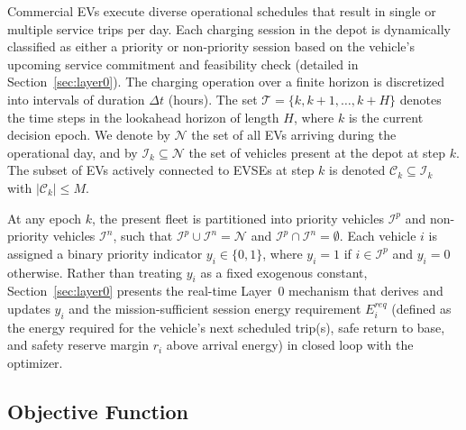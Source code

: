 \documentclass[final,3p,times,twocolumn]{elsarticle}
\begin{document}
Commercial EVs execute diverse operational schedules that result in single or multiple service trips per day. Each charging session in the depot is dynamically classified as either a priority or non-priority session based on the vehicle's upcoming service commitment and feasibility check (detailed in Section~\ref{sec:layer0}). The charging operation over a finite horizon is discretized into intervals of duration $\Delta t$ (hours). The set $\mathcal{T} = \{k, k+1, \dots, k+H\}$ denotes the time steps in the lookahead horizon of length $H$, where $k$ is the current decision epoch. We denote by $\mathcal{N}$ the set of all EVs arriving during the operational day, and by $\mathcal{I}_k \subseteq \mathcal{N}$ the set of vehicles present at the depot at step $k$. The subset of EVs actively connected to EVSEs at step $k$ is denoted $\mathcal{C}_k \subseteq \mathcal{I}_k$ with $|\mathcal{C}_k| \le M$.

At any epoch $k$, the present fleet is partitioned into priority vehicles $\mathcal{I}^p$ and non-priority vehicles $\mathcal{I}^n$, such that $\mathcal{I}^p \cup \mathcal{I}^n = \mathcal{N}$ and $\mathcal{I}^p \cap \mathcal{I}^n = \emptyset$. Each vehicle $i$ is assigned a binary priority indicator $y_i \in \{0, 1\}$, where $y_i = 1$ if $i \in \mathcal{I}^p$ and $y_i = 0$ otherwise. Rather than treating $y_i$ as a fixed exogenous constant, Section~\ref{sec:layer0} presents the real-time Layer~0 mechanism that derives and updates $y_i$ and the mission-sufficient session energy requirement $E_i^{req}$ (defined as the energy required for the vehicle's next scheduled trip(s), safe return to base, and safety reserve margin $r_i$ above arrival energy) in closed loop with the optimizer.

\subsection{Objective Function}
\label{sec:objective}
\end{document}
